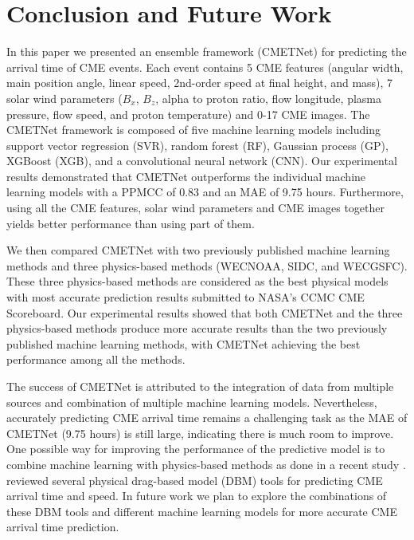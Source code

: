 \documentclass{article}
\begin{document}
\section{Conclusion and Future Work} \label{sec:conc}
In this paper we presented an ensemble framework (CMETNet)
for predicting the arrival time of CME events.
Each event contains 5 CME features
(angular width, 
main position angle, 
linear speed, 
2nd-order speed at final height, 
and mass),
7 solar wind parameters
($B_{x}$, 
$B_{z}$, 
alpha to proton ratio, 
flow longitude, 
plasma pressure, 
flow speed, 
and proton temperature) 
and 0-17 CME images.
The CMETNet framework is composed of five machine learning models including 
support vector regression (SVR), 
random forest (RF),
Gaussian process (GP),
XGBoost (XGB), and
a convolutional neural network (CNN).
Our experimental results demonstrated that
CMETNet outperforms the individual machine learning models
with a PPMCC of 0.83 and an MAE of 9.75 hours.
Furthermore, using all the CME features, 
solar wind parameters and CME images together
yields better performance than using
part of them.

We then compared CMETNet with two previously published machine learning 
methods \citep{2018ApJ...855..109L,2019ApJ...881...15W} 
and three physics-based methods 
(WECNOAA, SIDC, and WECGSFC).
These three physics-based methods
are considered as the best physical models with most accurate prediction results submitted to NASA's
CCMC CME Scoreboard.
Our experimental results showed that
both CMETNet and the three physics-based methods
produce more accurate results than
the two previously published machine learning 
methods, with CMETNet achieving the best performance
among all the methods.

The success of CMETNet is attributed to 
the integration of data from multiple sources and
combination of multiple machine learning models.
Nevertheless, accurately predicting CME arrival time
remains a challenging task as the MAE of CMETNet
(9.75 hours)
is still large, indicating there is much room to improve.
One possible way for improving the performance
of the predictive model is to
combine machine learning with physics-based methods
as done in a recent study \citep{2021EGUGA..23.7661T}.
\citet{2021FrASS...8...58D} reviewed several
physical drag-based model (DBM) tools for predicting
CME arrival time and speed.
In future work we plan to explore the combinations of
these DBM tools and different machine learning models
for more accurate CME arrival time prediction.
\end{document}
